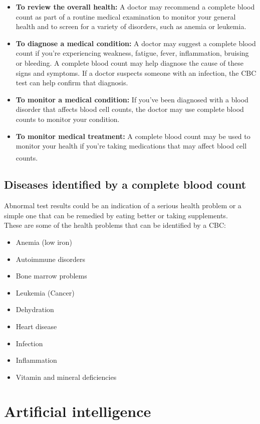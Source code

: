 \begin{itemize}
  \item \textbf{To review the overall health:} A doctor may recommend a complete blood count as part of a routine medical examination to monitor your general health and to screen for a variety of disorders, such as anemia or leukemia.
  \item \textbf{To diagnose a medical condition:} A doctor may suggest a complete blood count if you're experiencing weakness, fatigue, fever, inflammation, bruising or bleeding. A complete blood count may help diagnose the cause of these signs and symptoms. If a doctor suspects someone with an infection, the CBC test can help confirm that diagnosis.
  \item \textbf{To monitor a medical condition:} If you've been diagnosed with a blood disorder that affects blood cell counts, the doctor may use complete blood counts to monitor your condition.
  \item \textbf{To monitor medical treatment:} A complete blood count may be used to monitor your health if you're taking medications that may affect blood cell counts. \textsuperscript{\cite{Clicking_On_2022_mayoclinic}}
\end{itemize}

\subsection{Diseases identified by a complete blood count}

Abnormal test results could be an indication of a serious health problem or a simple one that can be remedied by eating better or taking supplements.\\
These are some of the health problems that can be identified by a CBC:

\begin{itemize}
  \item Anemia (low iron)
  \item Autoimmune disorders
  \item Bone marrow problems
  \item Leukemia (Cancer)
  \item Dehydration
  \item Heart disease
  \item Infection
  \item Inflammation
  \item Vitamin and mineral deficiencies
\end{itemize}

\section{Artificial intelligence}
